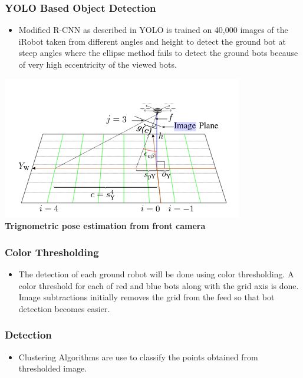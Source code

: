 \documentclass[12pt]{article}
\begin{document}
        \subsubsection{YOLO Based Object Detection}
            \begin{itemize}
                \item Modified R-CNN as described in YOLO is trained on 40,000 images of the iRobot taken from different angles and height to detect the ground bot at steep angles where the ellipse method fails to detect the ground bots because of very high eccentricity of the viewed bots.
            \end{itemize}
    \begin{center}\includegraphics[scale=0.44]{trig} \\
    \textbf{Trignometric pose estimation from front camera}\end{center}   
    	\subsubsection{Color Thresholding}       
			\begin{itemize}
        		\item The detection of each ground robot will be done using color             thresholding. A color threshold for each of red and blue bots along with the grid axis is done. Image subtractions initially removes the grid from the feed so that bot detection becomes easier.
        	\end{itemize}
		\subsubsection{Detection}
			\begin{itemize}           
				\item Clustering Algorithms are use to classify the points obtained from thresholded image.           
			\end{itemize}            
\end{document}
